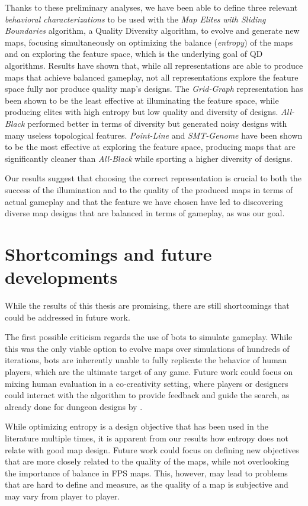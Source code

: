 Thanks to these preliminary analyses, we have been able to define three relevant \textit{behavioral characterizations} to be used with the \textit{Map Elites with Sliding Boundaries} algorithm, a Quality Diversity algorithm, to evolve and generate new maps, focusing simultaneously on optimizing the balance (\textit{entropy}) of the maps and on exploring the feature space, which is the underlying goal of QD algorithms. Results have shown that, while all representations are able to produce maps that achieve balanced gameplay, not all representations explore the feature space fully nor produce quality map's designs. The \textit{Grid-Graph} representation has been shown to be the least effective at illuminating the feature space, while producing elites with high entropy but low quality and diversity of designs. \textit{All-Black} performed better in terms of diversity but generated noisy designs with many useless topological features. \textit{Point-Line} and \textit{SMT-Genome} have been shown to be the most effective at exploring the feature space, producing maps that are significantly cleaner than \textit{All-Black} while sporting a higher diversity of designs.

Our results suggest that choosing the correct representation is crucial to both the success of the illumination and to the quality of the produced maps in terms of actual gameplay and that the feature we have chosen have led to discovering diverse map designs that are balanced in terms of gameplay, as was our goal.

\section{Shortcomings and future developments}

While the results of this thesis are promising, there are still shortcomings that could be addressed in future work. 

The first possible criticism regards the use of bots to simulate gameplay. While this was the only viable option to evolve maps over simulations of hundreds of iterations, bots are inherently unable to fully replicate the behavior of human players, which are the ultimate target of any game. Future work could focus on mixing human evaluation in a co-creativity setting, where players or designers could interact with the algorithm to provide feedback and guide the search, as already done for dungeon designs by \citet{alvarez_interactive_2022}.

While optimizing entropy is a design objective that has been used in the literature multiple times, it is apparent from our results how entropy does not relate with good map design. Future work could focus on defining new objectives that are more closely related to the quality of the maps, while not overlooking the importance of balance in FPS maps. This, however, may lead to problems that are hard to define and measure, as the quality of a map is subjective and may vary from player to player.

